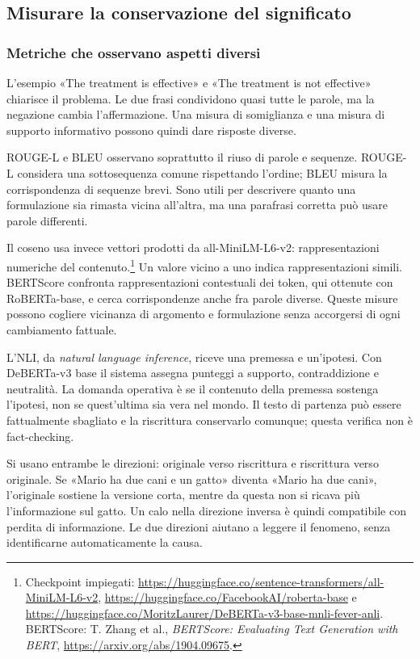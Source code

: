 \subsection{Misurare la conservazione del significato}\label{misurare-la-conservazione-del-significato}

\subsubsection{Metriche che osservano aspetti diversi}\label{metriche-che-osservano-aspetti-diversi}

L'esempio «The treatment is effective» e «The treatment is not effective» chiarisce il problema. Le due frasi condividono quasi tutte le parole, ma la negazione cambia l'affermazione. Una misura di somiglianza e una misura di supporto informativo possono quindi dare risposte diverse.

ROUGE-L e BLEU osservano soprattutto il riuso di parole e sequenze. ROUGE-L considera una sottosequenza comune rispettando l'ordine; BLEU misura la corrispondenza di sequenze brevi. Sono utili per descrivere quanto una formulazione sia rimasta vicina all'altra, ma una parafrasi corretta può usare parole differenti.

Il coseno usa invece vettori prodotti da all-MiniLM-L6-v2: rappresentazioni numeriche del contenuto.\footnote{Checkpoint impiegati: \url{https://huggingface.co/sentence-transformers/all-MiniLM-L6-v2}, \url{https://huggingface.co/FacebookAI/roberta-base} e \url{https://huggingface.co/MoritzLaurer/DeBERTa-v3-base-mnli-fever-anli}. BERTScore: T. Zhang et al., \emph{BERTScore: Evaluating Text Generation with BERT}, \url{https://arxiv.org/abs/1904.09675}.} Un valore vicino a uno indica rappresentazioni simili. BERTScore confronta rappresentazioni contestuali dei token, qui ottenute con RoBERTa-base, e cerca corrispondenze anche fra parole diverse. Queste misure possono cogliere vicinanza di argomento e formulazione senza accorgersi di ogni cambiamento fattuale.

L'NLI, da \emph{natural language inference}, riceve una premessa e un'ipotesi. Con DeBERTa-v3 base il sistema assegna punteggi a supporto, contraddizione e neutralità. La domanda operativa è se il contenuto della premessa sostenga l'ipotesi, non se quest'ultima sia vera nel mondo. Il testo di partenza può essere fattualmente sbagliato e la riscrittura conservarlo comunque; questa verifica non è fact-checking.

Si usano entrambe le direzioni: originale verso riscrittura e riscrittura verso originale. Se «Mario ha due cani e un gatto» diventa «Mario ha due cani», l'originale sostiene la versione corta, mentre da questa non si ricava più l'informazione sul gatto. Un calo nella direzione inversa è quindi compatibile con perdita di informazione. Le due direzioni aiutano a leggere il fenomeno, senza identificarne automaticamente la causa.

